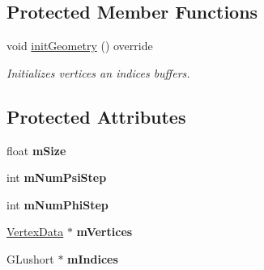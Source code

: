 \subsection*{Protected Member Functions}
\begin{DoxyCompactItemize}
\item 
\mbox{\label{class_geometry_engine_1_1_geometry_world_item_1_1_geometry_item_1_1_sphere_afd5ed67bcfa0c3ac4643aef1237526ac}} 
void \mbox{\hyperlink{class_geometry_engine_1_1_geometry_world_item_1_1_geometry_item_1_1_sphere_afd5ed67bcfa0c3ac4643aef1237526ac}{init\+Geometry}} () override
\begin{DoxyCompactList}\small\item\em Initializes vertices an indices buffers. \end{DoxyCompactList}\end{DoxyCompactItemize}
\subsection*{Protected Attributes}
\begin{DoxyCompactItemize}
\item 
\mbox{\label{class_geometry_engine_1_1_geometry_world_item_1_1_geometry_item_1_1_sphere_aab823ca3d76df47d414aafb21d3ef142}} 
float {\bfseries m\+Size}
\item 
\mbox{\label{class_geometry_engine_1_1_geometry_world_item_1_1_geometry_item_1_1_sphere_a4c8d79bcabd0c76907c9bc90712579bd}} 
int {\bfseries m\+Num\+Psi\+Step}
\item 
\mbox{\label{class_geometry_engine_1_1_geometry_world_item_1_1_geometry_item_1_1_sphere_a86c73228e679b2cafca1f77cc2ba4940}} 
int {\bfseries m\+Num\+Phi\+Step}
\item 
\mbox{\label{class_geometry_engine_1_1_geometry_world_item_1_1_geometry_item_1_1_sphere_a81e98e6f11580782bc612b8713eec8c9}} 
\mbox{\hyperlink{struct_geometry_engine_1_1_vertex_data}{Vertex\+Data}} $\ast$ {\bfseries m\+Vertices}
\item 
\mbox{\label{class_geometry_engine_1_1_geometry_world_item_1_1_geometry_item_1_1_sphere_a403e8338fe8c19fde0129bebc0eeffda}} 
G\+Lushort $\ast$ {\bfseries m\+Indices}
\end{DoxyCompactItemize}


